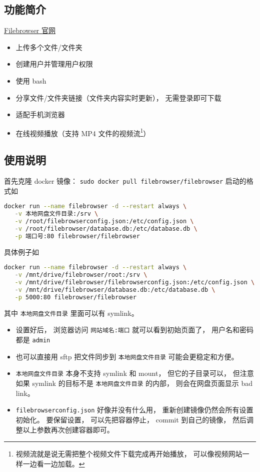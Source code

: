 
\subsection{功能简介}

\href{https://filebrowser.org/}{Filebrowser 官网}

\begin{itemize}
\item 上传多个文件/文件夹
\item 创建用户并管理用户权限
\item 使用 bash
\item 分享文件/文件夹链接（文件夹内容实时更新）， 无需登录即可下载
\item 适配手机浏览器
\item 在线视频播放（支持 MP4 文件的视频流\footnote{视频流就是说无需把整个视频文件下载完成再开始播放， 可以像视频网站一样一边看一边加载。}）
\end{itemize}

\subsection{使用说明}

首先克隆 docker 镜像： \verb`sudo docker pull filebrowser/filebrowser`
启动的格式如
\begin{lstlisting}[language=bash]
docker run --name filebrowser -d --restart always \
   -v 本地网盘文件目录:/srv \
   -v /root/filebrowserconfig.json:/etc/config.json \
   -v /root/filebrowser/database.db:/etc/database.db \
   -p 端口号:80 filebrowser/filebrowser
\end{lstlisting}
具体例子如 %
\begin{lstlisting}[language=bash]
docker run --name filebrowser -d --restart always \
   -v /mnt/drive/filebrowser/root:/srv \
   -v /mnt/drive/filebrowser/filebrowserconfig.json:/etc/config.json \
   -v /mnt/drive/filebrowser/database.db:/etc/database.db \
   -p 5000:80 filebrowser/filebrowser
\end{lstlisting}
其中 \verb`本地网盘文件目录` 里面可以有 symlink。

\begin{itemize}
\item 设置好后， 浏览器访问 \verb`网站域名:端口` 就可以看到初始页面了， 用户名和密码都是 \verb`admin`
\item 也可以直接用 sftp 把文件同步到 \verb`本地网盘文件目录` 可能会更稳定和方便。
\item \verb`本地网盘文件目录` 本身不支持 symlink 和 mount， 但它的子目录可以， 但注意如果 symlink 的目标不是 \verb`本地网盘文件目录` 的内部， 则会在网盘页面显示 bad link。
\item \verb`filebrowserconfig.json` 好像并没有什么用， 重新创建镜像仍然会所有设置初始化。 要保留设置， 可以先把容器停止， commit 到自己的镜像， 然后调整以上参数再次创建容器即可。
\end{itemize}

